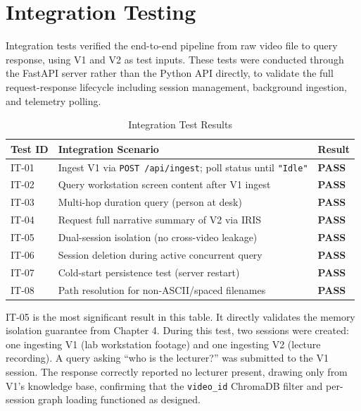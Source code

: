 \section{Integration Testing}

Integration tests verified the end-to-end pipeline from raw video file to query response, using V1 and V2 as test inputs. These tests were conducted through the FastAPI server rather than the Python API directly, to validate the full request-response lifecycle including session management, background ingestion, and telemetry polling.

\begin{table}[H]
\centering
\small
\caption{Integration Test Results}
\label{tab:integration}
\begin{tabularx}{\textwidth}{|l|X|l|}
\hline
\rowcolor[HTML]{EFEFEF}
\textbf{Test ID} & \textbf{Integration Scenario} & \textbf{Result} \\ \hline
IT-01 & Ingest V1 via \texttt{POST /api/ingest}; poll status until \texttt{"Idle"} & \textbf{PASS} \\ \hline
IT-02 & Query workstation screen content after V1 ingest & \textbf{PASS} \\ \hline
IT-03 & Multi-hop duration query (person at desk) & \textbf{PASS} \\ \hline
IT-04 & Request full narrative summary of V2 via IRIS & \textbf{PASS} \\ \hline
IT-05 & Dual-session isolation (no cross-video leakage) & \textbf{PASS} \\ \hline
IT-06 & Session deletion during active concurrent query & \textbf{PASS} \\ \hline
IT-07 & Cold-start persistence test (server restart) & \textbf{PASS} \\ \hline
IT-08 & Path resolution for non-ASCII/spaced filenames & \textbf{PASS} \\ \hline
\end{tabularx}
\end{table}

IT-05 is the most significant result in this table. It directly validates the memory isolation guarantee from Chapter 4. During this test, two sessions were created: one ingesting V1 (lab workstation footage) and one ingesting V2 (lecture recording). A query asking ``who is the lecturer?'' was submitted to the V1 session. The response correctly reported no lecturer present, drawing only from V1's knowledge base, confirming that the \texttt{video\_id} ChromaDB filter and per-session graph loading functioned as designed.

